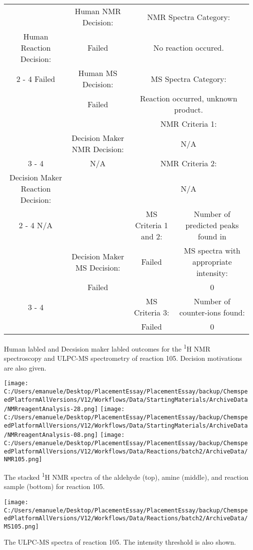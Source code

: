 \documentclass{article}%
\begin{document}
\begin{Decision Table}[H]%
\begin{tabular}{|c|c|c|c|}%
\hline%
&Human NMR Decision:&\multicolumn{2}{|c|}{NMR Spectra Category:}\\%
Human Reaction Decision:&Failed&\multicolumn{2}{|c|}{No reaction occured.}\\%
\cline{2%
-%
4}%
Failed&Human MS Decision:&\multicolumn{2}{|c|}{MS Spectra Category:}\\%
&Failed&\multicolumn{2}{|c|}{Reaction occurred, unknown product.}\\%
\hline%
&&\multicolumn{2}{|c|}{NMR Criteria 1:}\\%
&Decision Maker NMR Decision:&\multicolumn{2}{|c|}{N/A}\\%
\cline{3%
-%
4}%
&N/A&\multicolumn{2}{|c|}{NMR Criteria 2:}\\%
Decision Maker Reaction Decision:&&\multicolumn{2}{|c|}{N/A}\\%
\cline{2%
-%
4}%
N/A&&MS Criteria 1 and 2:&Number of predicted peaks found in\\%
&Decision Maker MS Decision:&Failed&MS spectra with appropriate intensity:\\%
&Failed&&0\\%
\cline{3%
-%
4}%
&&MS Criteria 3:&Number of counter{-}ions found:\\%
&&Failed&0\\%
\hline%
\end{tabular}%
\caption{Human labled and Decsision maker labled outcomes for the \textsuperscript{1}H NMR spectroscopy and ULPC-MS spectrometry of reaction 105. Decision motivations are also given.}%
\end{Decision Table}%
\begin{NMR Spectra}[H]%
\begin{center}%
\texttt{[image: C:/Users/emanuele/Desktop/PlacementEssay/PlacementEssay/backup/ChemspeedPlatformAllVersions/V12/Workflows/Data/StartingMaterials/ArchiveData/NMRreagentAnalysis-28.png]}\hfill%
\texttt{[image: C:/Users/emanuele/Desktop/PlacementEssay/PlacementEssay/backup/ChemspeedPlatformAllVersions/V12/Workflows/Data/StartingMaterials/ArchiveData/NMRreagentAnalysis-08.png]}\hfill%
\texttt{[image: C:/Users/emanuele/Desktop/PlacementEssay/PlacementEssay/backup/ChemspeedPlatformAllVersions/V12/Workflows/Data/Reactions/batch2/ArchiveData/NMR105.png]}\hfill%
\end{center}%
\caption{The stacked \textsuperscript{1}H NMR spectra of the aldehyde (top), amine (middle), and reaction sample (bottom) for reaction 105.}%
\end{NMR Spectra}%
\begin{MS Spectra}[H]%
\begin{center}%
\texttt{[image: C:/Users/emanuele/Desktop/PlacementEssay/PlacementEssay/backup/ChemspeedPlatformAllVersions/V12/Workflows/Data/Reactions/batch2/ArchiveData/MS105.png]}\hfill%
\end{center}%
\caption{The ULPC-MS spectra of reaction 105. The intensity threshold is also shown.}%
\end{MS Spectra}%
\end{document}
